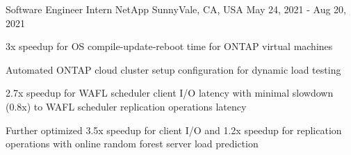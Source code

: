 \begin{cventries}
  \cventry
    {Software Engineer Intern} %
    {NetApp} %
    {SunnyVale, CA, USA} %
    {May 24, 2021 - Aug 20, 2021} %
    {
      \begin{cvitems} %
        \item {3x speedup for OS compile-update-reboot time for ONTAP virtual machines}
        \item {Automated ONTAP cloud cluster setup configuration for dynamic load testing}
        \item {2.7x speedup for WAFL scheduler client I/O latency with minimal
               slowdown (0.8x) to WAFL scheduler replication operations latency}
        \item {Further optimized 3.5x speedup for client I/O and 1.2x speedup
               for replication operations with online random forest server
               load prediction}
      \end{cvitems}
    }



\end{cventries}
